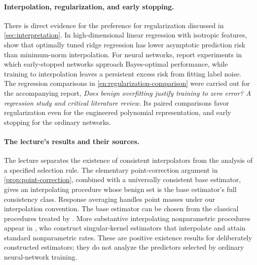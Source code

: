 \documentclass[11pt,twoside]{article}
\theoremstyle{definition}
\theoremstyle{remark}
\begin{document}
\paragraph{Interpolation, regularization, and early stopping.}
There is direct evidence for the preference for regularization discussed
in \cref{sec:interpretation}. In high-dimensional linear regression with
isotropic features, \citet[\S6.1]{hastie2022} show that optimally tuned ridge
regression has lower asymptotic prediction risk than minimum-norm
interpolation. For neural networks,
\citet[\S4.2]{mallinar2022} report experiments in which early-stopped
networks approach Bayes-optimal performance, while training to interpolation
leaves a persistent excess risk from fitting label noise.
The regression comparisons in
\hyperlink{note:regularization-comparison}{\cref*{en:regularization-comparison}}
were carried out for the accompanying report, \emph{Does benign overfitting
justify training to zero error? A regression study and critical literature
review}. Its paired comparisons favor regularization even for the
engineered polynomial representation, and early stopping for the ordinary
networks.

\paragraph{The lecture's results and their sources.}
The lecture separates the existence of consistent interpolators from the
analysis of a specified selection rule. The elementary point-correction
argument in \cref{prop:point-correction}, combined with a universally
consistent base estimator, gives an interpolating procedure whose benign
set is the base estimator's full consistency class. Response averaging
handles point masses under our interpolation convention. The base estimator
can be chosen from the classical procedures treated by \citet{gyorfi2002}.
More substantive interpolating nonparametric procedures appear in
\citet{belkin2019optimality}, who construct singular-kernel estimators that
interpolate and attain standard nonparametric rates. These are positive
existence results for deliberately constructed estimators; they do not
analyze the predictors selected by ordinary neural-network training.
\end{document}
